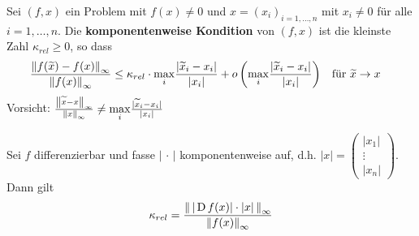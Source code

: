 \begin{Defe}
  Sei $(f, x) $ ein Problem mit $f(x)\neq 0$ 
  und $x=(x_i)_{i=1,\ldots , n}$ mit $x_i\neq 0 $  für alle $i=1,\ldots, n$.
  Die \textbf{komponentenweise Kondition} von $(f,x)$
  ist die kleinste Zahl $\kappa_{rel}\geq 0$, so dass
  \begin{align*}
    \frac{\nn[f(\widetilde{x})-f(x)]_\infty}{\nn[f(x)]_\infty} 
    &\leq \kappa_{rel} 
      \cdot \underset{i}{\max}
      \frac{|\widetilde{x}_i-x_i|}{|x_i|}
      + o\left(\underset{i}{\max}\frac{|\widetilde{x}_i-x_i|}{|x_i|}\right) 
    && \text{für }\widetilde{x}\to x
  \end{align*}
  Vorsicht:
$
    \frac{\nn[\widetilde{x}-x]_\infty}{\nn[x]_\infty}
    \neq \underset{i}{\max}\frac{|\widetilde{x}_i-x_i|}{|x_i|}
$
\end{Defe}

\begin{Leme}
  \label{3.2.17}
  Sei $f$ differenzierbar und fasse $|\,\cdot\,|$ komponentenweise auf,
  d.h. $|x| = \begin{pmatrix}
    |x_1| \\
    \vdots \\
    |x_n|
  \end{pmatrix}$.
  Dann gilt
  \begin{gather}
    \kappa_{rel} = \frac{\nn[\, |\D f(x)|\cdot |x| \,]_\infty}{\nn[f(x)]_\infty} \label{III.2.16}
  \end{gather}
\end{Leme}


